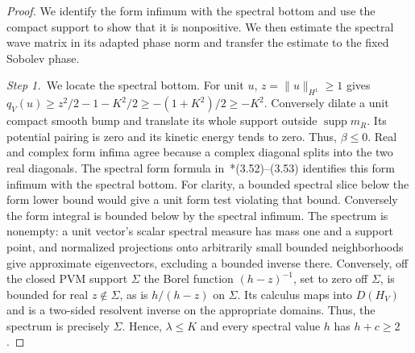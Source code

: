 \begin{proof}
  We identify the form infimum with the spectral bottom and use the compact
  support to show that it is nonpositive. We then estimate the spectral wave
  matrix in its adapted phase norm and transfer the estimate to the fixed
  Sobolev phase.


  \medskip
  \noindent\textit{Step 1.~}We locate the spectral bottom.
  For unit $u$, $z = \|u\|_{H^1} \ge 1$ gives $q_V(u) \ge z^2/2-1-K^2/2 \ge
  -(1+K^2)/2 \ge -K^2$. Conversely dilate a unit compact smooth bump and
  translate its whole support outside $\operatorname{supp}m_R$. Its potential
  pairing is zero and its kinetic energy tends to zero. Thus, $\beta \le 0$.
  Real and complex form infima agree because a complex diagonal splits into the
  two real diagonals. The spectral form formula
  in~\cite{teschl:14:mathematical}*{(3.52)--(3.53)} identifies this form infimum
  with the spectral bottom. For clarity, a bounded spectral slice below the form
  lower bound would give a unit form test violating that bound. Conversely the
  form integral is bounded below by the spectral infimum. The spectrum is
  nonempty: a unit vector's scalar spectral measure has mass one and a support
  point, and normalized projections onto arbitrarily small bounded neighborhoods
  give approximate eigenvectors, excluding a bounded inverse there. Conversely,
  off the closed PVM support $\Sigma$ the Borel function $(h-z)^{-1}$, set to
  zero off $\Sigma$, is bounded for real $z\notin\Sigma$, as is $h/(h-z)$ on
  $\Sigma$. Its calculus maps into $D(H_V)$ and is a two-sided resolvent inverse
  on the appropriate domains. Thus, the spectrum is precisely $\Sigma$. Hence,
  $\lambda \le K$ and every spectral value $h$ has $h+c \ge 2$.



\end{proof}
